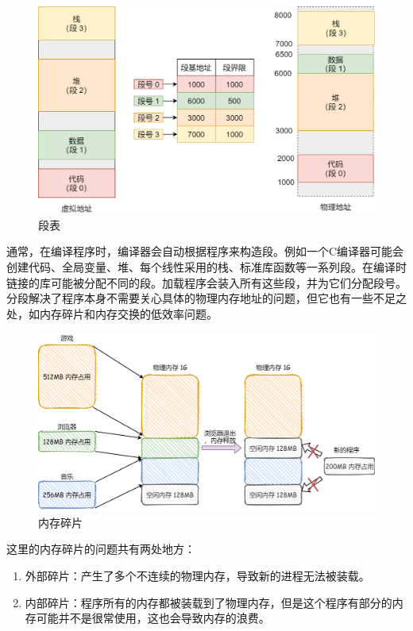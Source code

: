 \begin{figure}[H]
    \centering
    \includegraphics[scale=0.35]{img/Chapter3/3-4/1.png}
    \caption{段表}
\end{figure}

通常，在编译程序时，编译器会自动根据程序来构造段。例如一个C编译器可能会创建代码、全局变量、堆、每个线性采用的栈、标准库函数等一系列段。在编译时链接的库可能被分配不同的段。加载程序会装入所有这些段，并为它们分配段号。\\

分段解决了程序本身不需要关心具体的物理内存地址的问题，但它也有一些不足之处，如内存碎片和内存交换的低效率问题。

\begin{figure}[H]
    \centering
    \includegraphics[scale=0.25]{img/Chapter3/3-4/2.png}
    \caption{内存碎片}
\end{figure}

这里的内存碎片的问题共有两处地方：

\begin{enumerate}
    \item 外部碎片：产生了多个不连续的物理内存，导致新的进程无法被装载。

    \item 内部碎片：程序所有的内存都被装载到了物理内存，但是这个程序有部分的内存可能并不是很常使用，这也会导致内存的浪费。
\end{enumerate}

